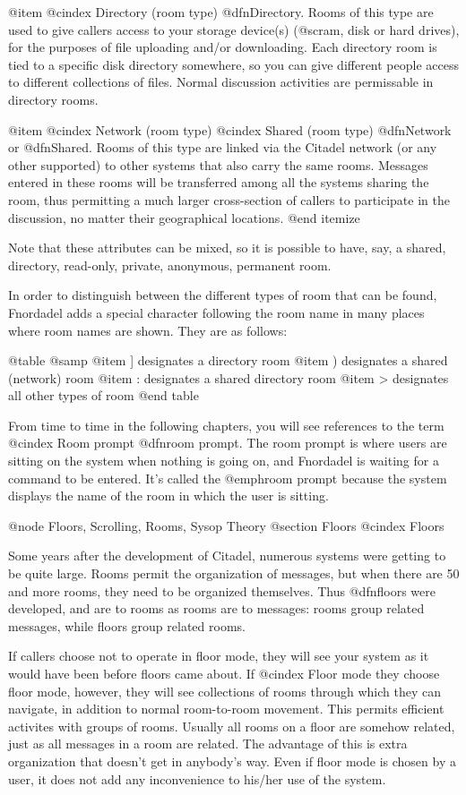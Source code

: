 @item
@cindex Directory (room type)
@dfn{Directory}.  Rooms of this type are used to give callers
access to your storage device(s) (@sc{ram}, disk or hard drives),
for the purposes of file uploading and/or downloading.
Each directory room is tied to a specific disk directory
somewhere, so you can give different people access to
different collections of files.  Normal discussion
activities are permissable in directory rooms.

@item
@cindex Network (room type)
@cindex Shared (room type)
@dfn{Network} or @dfn{Shared}.  Rooms of this type are linked via the
Citadel network (or any other supported) to other systems
that also carry the same rooms.  Messages entered in
these rooms will be transferred among all the systems
sharing the room, thus permitting a much larger cross-section
of callers to participate in the discussion, no
matter their geographical locations.
@end itemize

Note that these attributes can be mixed, so it is possible to
have, say, a shared, directory, read-only, private, anonymous, permanent room.

In order to distinguish between the different types of room that can
be found, Fnordadel adds a special character following the room name in many
places where room names are shown.  They are as follows:

@table @samp
@item ]
designates a directory room
@item )
designates a shared (network) room
@item :
designates a shared directory room
@item >
designates all other types of room
@end table

From time to time in the following chapters, you will see references
to the term
@cindex Room prompt
@dfn{room prompt}.  The room prompt is where users are sitting
on the
system when nothing is going on, and Fnordadel is waiting for a command to
be entered.  It's called the @emph{room} prompt because the system displays the
name of the room in which the user is sitting.

@node Floors, Scrolling, Rooms, Sysop Theory
@section Floors
@cindex Floors

Some years after the development of Citadel, numerous
systems were getting to be quite large.  Rooms permit the organization
of messages, but when there are 50 and more rooms, they need to be
organized themselves.  Thus
@dfn{floors} were developed, and are to rooms
as rooms are to messages: rooms group related messages, while
floors group related rooms.

If callers choose not to operate in floor mode, they will
see your system as it would have been before floors came about.  If
@cindex Floor mode
they choose floor mode, however, they will see collections of rooms
through which they can navigate, in addition to normal room-to-room
movement.  This permits efficient activites with groups of rooms.
Usually all rooms on a floor are somehow related, just as all messages
in a room are related.  The advantage of this is extra organization
that doesn't get in anybody's way.  Even if floor mode is chosen by
a user, it does not add any inconvenience to his/her use of the system.

